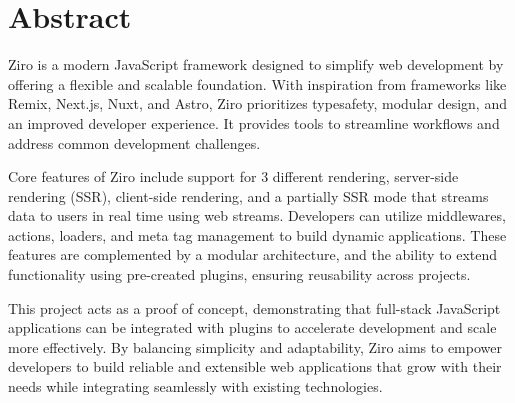 \section{Abstract}

Ziro is a modern JavaScript framework designed to simplify web development by offering a flexible and scalable foundation. With inspiration from frameworks like Remix, Next.js, Nuxt, and Astro, Ziro prioritizes typesafety, modular design, and an improved developer experience. It provides tools to streamline workflows and address common development challenges.

Core features of Ziro include support for 3 different rendering, server-side rendering (SSR), client-side rendering, and a partially SSR mode that streams data to users in real time using web streams. Developers can utilize middlewares, actions, loaders, and meta tag management to build dynamic applications. These features are complemented by a modular architecture, and the ability to extend functionality using pre-created plugins, ensuring reusability across projects.

This project acts as a proof of concept, demonstrating that full-stack JavaScript applications can be integrated with plugins to accelerate development and scale more effectively. By balancing simplicity and adaptability, Ziro aims to empower developers to build reliable and extensible web applications that grow with their needs while integrating seamlessly with existing technologies.
\\
\\
\\
\\


\pagebreak
